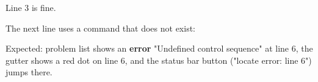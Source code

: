 \documentclass{article}
\begin{document}
Line 3 is fine.

The next line uses a command that does not exist:

Expected: problem list shows an \textbf{error} "Undefined control sequence" at
line 6, the gutter shows a red dot on line 6, and the status bar button
("locate error: line 6") jumps there.
\end{document}

